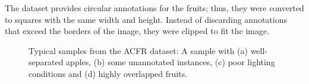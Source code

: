 The dataset provides circular annotations for the fruits; thus, they were converted to squares with the same width and height. Instead of discarding annotations that exceed the borders of the image, they were clipped to fit the image.
 
 \begin{figure}[!htb]
  \centering
  
  \caption{Typical samples from the ACFR dataset: A sample with (a) well-separated apples, (b) some unannotated instances, 
  		(c) poor lighting conditions and (d) highly overlapped fruits.}
  \label{ch4:fig1}
\end{figure}
 
